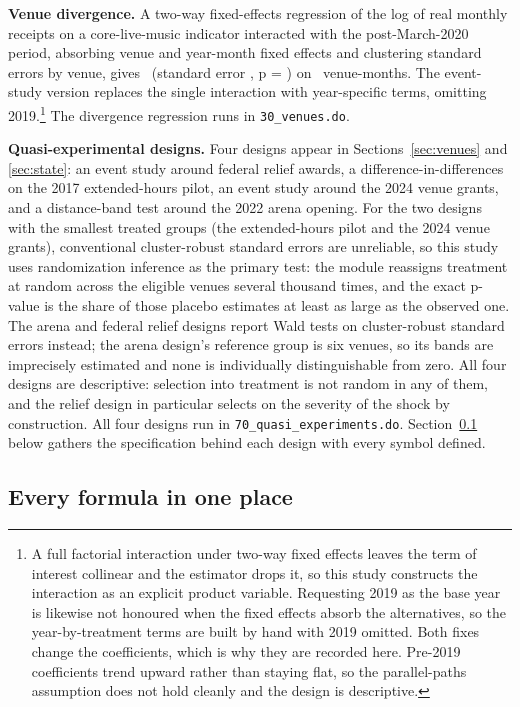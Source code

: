 \textbf{Venue divergence.} A two-way fixed-effects regression of the log of
real monthly receipts on a core-live-music indicator interacted with the
post-March-2020 period, absorbing venue and year-month fixed effects and
clustering standard errors by venue, gives \NVenueDidCoef\ (standard error
\NVenueDidSe, p = \NVenueDidP) on \NVenueDidN\ venue-months. The event-study
version replaces the single interaction with year-specific terms, omitting
2019.\footnote{A full factorial interaction under two-way fixed effects
leaves the term of interest collinear and the estimator drops it, so this
study constructs the interaction as an explicit product variable. Requesting
2019 as the base year is likewise not honoured when the fixed effects absorb
the alternatives, so the year-by-treatment terms are built by hand with 2019
omitted. Both fixes change the coefficients, which is why they are recorded
here. Pre-2019 coefficients trend upward rather than staying flat, so the
parallel-paths assumption does not hold cleanly and the design is
descriptive.} The divergence regression runs in \texttt{30\_venues.do}.

\textbf{Quasi-experimental designs.} Four designs appear in
Sections~\ref{sec:venues} and \ref{sec:state}: an event study around federal
relief awards, a difference-in-differences on the 2017 extended-hours pilot,
an event study around the 2024 venue grants, and a distance-band test around
the 2022 arena opening. For the two designs with the smallest treated groups
(the extended-hours pilot and the 2024 venue grants), conventional
cluster-robust standard errors are unreliable, so this study uses
randomization inference as the primary test: the module reassigns treatment
at random across the eligible venues several thousand times, and the exact
p-value is the share of those placebo estimates at least as large as the
observed one. The arena and federal relief designs report Wald tests on
cluster-robust standard errors instead; the arena design's reference group
is six venues, so its bands are imprecisely estimated and none is
individually distinguishable from zero. All four designs are descriptive:
selection into treatment is not random in any of them, and the relief design
in particular selects on the severity of the shock by construction. All four
designs run in \texttt{70\_quasi\_experiments.do}. Section~\ref{sec:formulas}
below gathers the specification behind each design with every symbol defined.

\subsection{Every formula in one place}
\label{sec:formulas}

